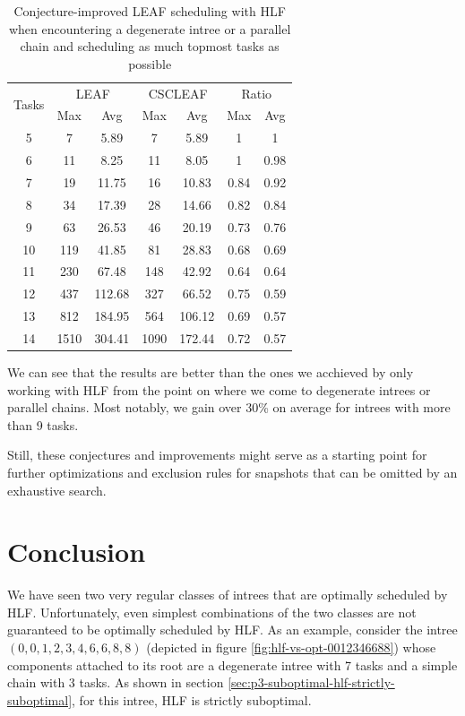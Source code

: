 \begin{table}[th]
  \centering
  \begin{tabular}[ht]{ccccccc}
    \multirow{2}{*}{Tasks} & \multicolumn{2}{c}{LEAF} & \multicolumn{2}{c}{CSCLEAF} & \multicolumn{2}{c}{Ratio}\\
    &  Max & Avg & Max & Avg & Max & Avg\\
    \hline
    5 & 7 & 5.89 & 7 & 5.89 & 1 & 1\\
    6 & 11 & 8.25 & 11 & 8.05 & 1 & 0.98\\
    7 & 19 & 11.75 & 16 & 10.83 & 0.84 & 0.92 \\
    8 & 34 & 17.39 & 28 & 14.66 & 0.82 & 0.84 \\
    9 & 63 & 26.53 & 46 & 20.19 & 0.73 & 0.76 \\
    10 & 119 & 41.85 & 81 & 28.83 & 0.68 & 0.69 \\
    11 & 230 & 67.48 & 148 & 42.92 & 0.64 & 0.64 \\
    12 & 437 & 112.68 & 327 & 66.52 & 0.75 & 0.59 \\
    13 & 812 & 184.95 & 564 & 106.12 & 0.69 & 0.57 \\
    14 & 1510 & 304.41 & 1090 & 172.44 & 0.72 & 0.57 \\
  \end{tabular}
  \caption{Conjecture-improved LEAF scheduling with HLF when encountering a degenerate intree or a parallel chain and scheduling as much topmost tasks as possible}
  \label{tab:improving-improved-leaf-scheduler-benchmark}
\end{table}

We can see that the results are better than the ones we acchieved by only working with HLF from the point on where we come to degenerate intrees or parallel chains. Most notably, we gain over 30\% on average for intrees with more than 9 tasks.

Still, these conjectures and improvements might serve as a starting point for further optimizations and exclusion rules for snapshots that can be omitted by an exhaustive search.

\section{Conclusion}
\label{sec:properties-schedules-conclusion}

We have seen two very regular classes of intrees that are optimally scheduled by HLF. Unfortunately, even simplest combinations of the two classes are not guaranteed to be optimally scheduled by HLF. As an example, consider the intree $(0,0,1,2,3,4,6,6,8,8)$ (depicted in figure \ref{fig:hlf-vs-opt-0012346688}) whose components attached to its root are a degenerate intree with 7 tasks and a simple chain with 3 tasks. As shown in section \ref{sec:p3-suboptimal-hlf-strictly-suboptimal}, for this intree, HLF is strictly suboptimal.

